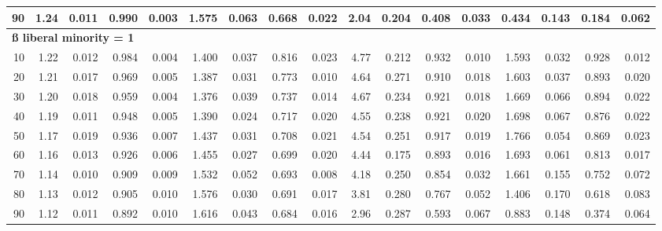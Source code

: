 \documentclass[
]{article}
\begin{document}
\begin{table}[H]
{\begin{tabular}{r|r|r|r|r|r|r|r|r|r|r|r|r|r|r|r|r}
\hline
\hspace{1em}90 & 1.24 & 0.011 & 0.990 & 0.003 & 1.575 & 0.063 & 0.668 & 0.022 & 2.04 & 0.204 & 0.408 & 0.033 & 0.434 & 0.143 & 0.184 & 0.062\\
\hline
\multicolumn{17}{l}{\textbf{ß liberal minority = 1}}\\
\hline
\hspace{1em}10 & 1.22 & 0.012 & 0.984 & 0.004 & 1.400 & 0.037 & 0.816 & 0.023 & 4.77 & 0.212 & 0.932 & 0.010 & 1.593 & 0.032 & 0.928 & 0.012\\
\hline
\hspace{1em}20 & 1.21 & 0.017 & 0.969 & 0.005 & 1.387 & 0.031 & 0.773 & 0.010 & 4.64 & 0.271 & 0.910 & 0.018 & 1.603 & 0.037 & 0.893 & 0.020\\
\hline
\hspace{1em}30 & 1.20 & 0.018 & 0.959 & 0.004 & 1.376 & 0.039 & 0.737 & 0.014 & 4.67 & 0.234 & 0.921 & 0.018 & 1.669 & 0.066 & 0.894 & 0.022\\
\hline
\hspace{1em}40 & 1.19 & 0.011 & 0.948 & 0.005 & 1.390 & 0.024 & 0.717 & 0.020 & 4.55 & 0.238 & 0.921 & 0.020 & 1.698 & 0.067 & 0.876 & 0.022\\
\hline
\hspace{1em}50 & 1.17 & 0.019 & 0.936 & 0.007 & 1.437 & 0.031 & 0.708 & 0.021 & 4.54 & 0.251 & 0.917 & 0.019 & 1.766 & 0.054 & 0.869 & 0.023\\
\hline
\hspace{1em}60 & 1.16 & 0.013 & 0.926 & 0.006 & 1.455 & 0.027 & 0.699 & 0.020 & 4.44 & 0.175 & 0.893 & 0.016 & 1.693 & 0.061 & 0.813 & 0.017\\
\hline
\hspace{1em}70 & 1.14 & 0.010 & 0.909 & 0.009 & 1.532 & 0.052 & 0.693 & 0.008 & 4.18 & 0.250 & 0.854 & 0.032 & 1.661 & 0.155 & 0.752 & 0.072\\
\hline
\hspace{1em}80 & 1.13 & 0.012 & 0.905 & 0.010 & 1.576 & 0.030 & 0.691 & 0.017 & 3.81 & 0.280 & 0.767 & 0.052 & 1.406 & 0.170 & 0.618 & 0.083\\
\hline
\hspace{1em}90 & 1.12 & 0.011 & 0.892 & 0.010 & 1.616 & 0.043 & 0.684 & 0.016 & 2.96 & 0.287 & 0.593 & 0.067 & 0.883 & 0.148 & 0.374 & 0.064\\
\hline
\end{tabular}}\begin{table}
\centering
{}
\end{table}
\end{table}
\end{document}
